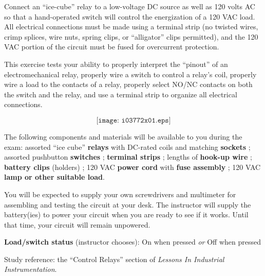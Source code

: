 

Connect an ``ice-cube'' relay to a low-voltage DC source as well as 120 volts AC so that a hand-operated switch will control the energization of a 120 VAC load.  All electrical connections must be made using a terminal strip (no twisted wires, crimp splices, wire nuts, spring clips, or ``alligator'' clips permitted), and the 120 VAC portion of the circuit must be fused for overcurrent protection.

This exercise tests your ability to properly interpret the ``pinout'' of an electromechanical relay, properly wire a switch to control a relay's coil, properly wire a load to the contacts of a relay, properly select NO/NC contacts on both the switch and the relay, and use a terminal strip to organize all electrical connections.

$$\texttt{[image: i03772x01.eps]}$$

\vskip 10pt

The following components and materials will be available to you during the exam: assorted ``ice cube'' {\bf relays} with DC-rated coils and matching {\bf sockets} ; assorted pushbutton {\bf switches} ; {\bf terminal strips} ; lengths of {\bf hook-up wire} ; {\bf battery clips} (holders) ; 120 VAC {\bf power cord} with {\bf fuse assembly} ; 120 VAC {\bf lamp or other suitable load}.

\vskip 10pt

You will be expected to supply your own screwdrivers and multimeter for assembling and testing the circuit at your desk.  The instructor will supply the battery(ies) to power your circuit when you are ready to see if it works.  Until that time, your circuit will remain unpowered.

\vskip 20pt

\noindent
{\bf Load/switch status} (instructor chooses): \hskip 20pt \underbar{\hskip 20pt} On when pressed \hskip 10pt {\it or} \hskip 10pt \underbar{\hskip 20pt} Off when pressed

\vfil

Study reference: the ``Control Relays'' section of {\it Lessons In Industrial Instrumentation}.

\eject

















